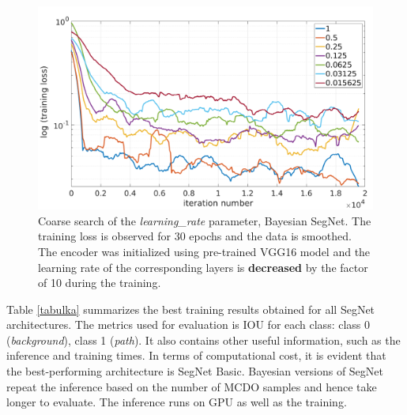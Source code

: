\vspace{5mm}
\begin{figure}[h]
	\begin{center}
		\includegraphics*[width=14cm, keepaspectratio]{obr/bayes_full_rough_2.png}
	\end{center}
	\vspace{5mm}
	\caption{Coarse search of the \textit{learning\_rate} parameter, Bayesian SegNet. The training loss is observed for 30 epochs and the data is smoothed. The encoder was initialized using pre-trained VGG16 model and the learning rate of the corresponding layers is \textbf{decreased} by the factor of 10 during the training.} 
	\label{tuning2}
\end{figure}

Table \ref{tabulka} summarizes the best training results obtained for all SegNet architectures. The metrics used for evaluation is IOU for each class: class 0 (\textit{background}), class 1 (\textit{path}). It also contains other useful information, such as the inference and training times. In terms of computational cost, it is evident that the best-performing architecture is SegNet Basic. Bayesian versions of SegNet repeat the inference based on the number of MCDO samples and hence take longer to evaluate. The inference runs on GPU as well as the training.


